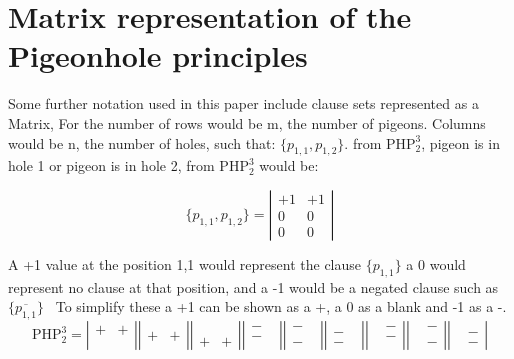 \documentclass{report}
\newcommand{\set}[1]{\{ #1 \}}
\newcommand{\ol}{\overline}
\newcommand{\php}{\mathrm{PHP}}
\begin{document}
\section{Matrix representation of the Pigeonhole principles}
\label{sec:phpMatrix}

Some further notation used in this paper include clause sets represented as a Matrix,
For \bmm{\php^m_k} the number of rows would be m, the number of pigeons.
Columns would be n, the number of holes, such that: $\set{p_{1,1},p_{1,2}}.$ from $\php^3_2$,  pigeon is in hole 1 or pigeon is in hole 2, from $\php^3_2$ would be:

 
\[ \set{p_{1,1},p_{1,2}} = \left| \begin{array}{ccc}
+1 & +1 \\
 0 & 0 \\
 0 & 0 \end{array} \right| \] 
 
 A +1 value at the position 1,1 would represent the clause $\set{p_{1,1}}$ a 0 would represent no clause at that position, and a -1 would be a negated clause such as $\set{\ol{p_{1,1}}}$
 \
 To simplify these a +1 can be shown as a +, a 0 as a blank and -1 as a -.
 \[ \php^3_2 =
 \left| \begin{array}{ccc}
 + & + \\
   &   \\
   &   \end{array} \right|
 \left| \begin{array}{ccc}
   &   \\
 + & + \\
   &   \end{array} \right|
 \left| \begin{array}{ccc}
   &   \\
   &   \\
 + & + \end{array} \right|
 \left| \begin{array}{ccc}
 - &   \\
 - &   \\
   &   \end{array} \right|
 \left| \begin{array}{ccc}
 - &   \\
   &   \\
 - &   \end{array} \right|
 \left| \begin{array}{ccc}
   &   \\
 - &   \\
 - &   \end{array} \right|
 \left| \begin{array}{ccc}
   & - \\
   & - \\
   &   \end{array} \right|
 \left| \begin{array}{ccc}
   & - \\
   &   \\
   & - \end{array} \right|
 \left| \begin{array}{ccc}
   &   \\
   & - \\
   & - \end{array} \right|
\] 
 
\end{document}
